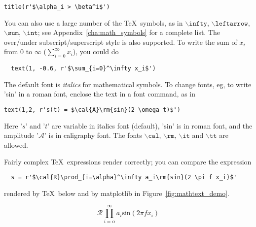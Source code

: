 \documentclass[]{book}
\begin{document}
\begin{lstlisting}
title(r'$\alpha_i > \beta^i$')
\end{lstlisting}


You can also use a large number of the \TeX\ symbols, as in
$\mathtt{\backslash infty}$, $\mathtt{\backslash leftarrow}$,
$\mathtt{\backslash sum}$, $\mathtt{\backslash int}$; see
Appendix~\ref{cha:math_symbols} for a complete list.  The over/under
subscript/superscript style is also supported.  To write the sum of
$x_i$ from 0 to $\infty$ ($\sum_{i=0}^\infty x_i$), you could do 

\begin{lstlisting}
  text(1, -0.6, r'$\sum_{i=0}^\infty x_i$')
\end{lstlisting}

The default font is \textit{italics} for mathematical symbols.  To
change fonts, eg, to write 'sin' in a \textrm{roman font}, enclose the
text in a font command, as in

\begin{lstlisting}
text(1,2, r's(t) = $\cal{A}\rm{sin}(2 \omega t)$')
\end{lstlisting}

\noindent Here '$s$' and '$t$' are variable in italics font (default),
'$\mathrm{sin}$' is in roman font, and the amplitude '$\mathcal{A}$'
is in caligraphy font.  The fonts $\mathtt{\backslash cal}$,
$\mathtt{\backslash rm}$, $\mathtt{\backslash it}$ and
$\mathtt{\backslash tt}$ are allowed.

Fairly complex \TeX\ expressions render correctly; you can compare the
expression

\begin{verbatim}
  s = r'$\cal{R}\prod_{i=\alpha}^\infty a_i\rm{sin}(2 \pi f x_i)$'
\end{verbatim}

\noindent rendered by \TeX\ below and by matplotlib in
Figure~\ref{fig:mathtext_demo}.

\begin{equation}
    \mathcal{R}\prod_{i=\alpha}^\infty a_i\mathrm{sin}(2 \pi f x_i)
\end{equation}



\end{document}
